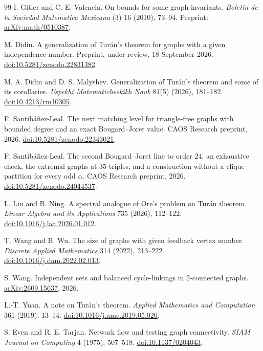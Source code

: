 \documentclass[11pt]{article}
\theoremstyle{remark}
\begin{document}
\begin{thebibliography}{99}
 I. Gitler and C. E. Valencia.
On bounds for some graph invariants.
\emph{Boletin de la Sociedad Matematica Mexicana} (3) 16 (2010), 73--94.
Preprint: \href{https://arxiv.org/abs/math/0510387}{arXiv:math/0510387}.

 M. Didin.
A generalization of Tur\'an's theorem for graphs with a given independence number.
Preprint, under review, 18 September 2026.
\href{https://doi.org/10.5281/zenodo.22831382}{doi:10.5281/zenodo.22831382}.

 M. A. Didin and D. S. Malyshev.
Generalization of Tur\'an's theorem and some of its corollaries.
\emph{Uspekhi Matematicheskikh Nauk} 81(5) (2026), 181--182.
\href{https://doi.org/10.4213/rm10305}{doi:10.4213/rm10305}.

 F. Santib\'a\~nez-Leal.
The next matching level for triangle-free graphs with bounded degree and an exact Bougard--Joret value.
CAOS Research preprint, 2026.
\href{https://doi.org/10.5281/zenodo.22343021}{doi:10.5281/zenodo.22343021}.

 F. Santib\'a\~nez-Leal.
The second Bougard--Joret line to order 24: an exhaustive check, the extremal graphs at 35 triples, and a construction without a clique partition for every odd $\alpha$.
CAOS Research preprint, 2026.
\href{https://doi.org/10.5281/zenodo.24044537}{doi:10.5281/zenodo.24044537}.

 L. Liu and B. Ning.
A spectral analogue of Ore's problem on Tur\'an theorem.
\emph{Linear Algebra and its Applications} 735 (2026), 112--122.
\href{https://doi.org/10.1016/j.laa.2026.01.012}{doi:10.1016/j.laa.2026.01.012}.

 T. Wang and B. Wu.
The size of graphs with given feedback vertex number.
\emph{Discrete Applied Mathematics} 314 (2022), 213--222.
\href{https://doi.org/10.1016/j.dam.2022.02.013}{doi:10.1016/j.dam.2022.02.013}.

 S. Wang.
Independent sets and balanced cycle-linkings in 2-connected graphs.
\href{https://arxiv.org/abs/2609.15637}{arXiv:2609.15637}, 2026.

 L.-T. Yuan.
A note on Tur\'an's theorem.
\emph{Applied Mathematics and Computation} 361 (2019), 13--14.
\href{https://doi.org/10.1016/j.amc.2019.05.020}{doi:10.1016/j.amc.2019.05.020}.

 S. Even and R. E. Tarjan.
Network flow and testing graph connectivity.
\emph{SIAM Journal on Computing} 4 (1975), 507--518.
\href{https://doi.org/10.1137/0204043}{doi:10.1137/0204043}.


\end{thebibliography}
\end{document}
